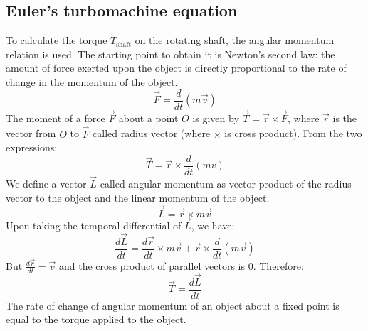 \documentclass[class=report, crop=false, 12pt,a4paper]{standalone}
\begin{document}
\subsection{Euler's turbomachine equation}
To calculate the torque $T_{\textrm{shaft}}$ on the rotating shaft, the angular momentum relation is used. The starting point to obtain it is Newton's second law: the amount of force exerted upon the object is directly proportional to the rate of change in the momentum of the object.
\begin{equation}
  \vec{F} = \frac{d}{dt}(m\vec{v})
\end{equation}
The moment of a force $\vec{F}$ about a point $O$ is given by $\vec{T} = \vec{r}\times\vec{F}$, where $\vec{r}$ is the vector from $O$ to $\vec{F}$ called radius vector (where $\times$ is cross product). From the two expressions:
\begin{equation}
  \vec{T} = \vec{r} \times \frac{d}{dt} (mv)
\end{equation}
We define a vector $\vec{L}$ called angular momentum as vector product of the radius vector to the object and the linear momentum of the object.
\begin{equation}
  \vec{L} = \vec{r} \times m \vec{v}
\end{equation}
Upon taking the temporal differential of $\vec{L}$, we have: 
\begin{equation}
  \frac{d\vec{L}}{dt} = \frac{d\vec{r}}{dt} \times m\vec{v} + \vec{r} \times \frac{d}{dt}(m\vec{v})
\end{equation}
But $ \frac{d\vec{r}}{dt} = \vec{v}$ and the cross product of parallel vectors is 0. Therefore:
\begin{equation}
  \vec{T} = \frac{d\vec{L}}{dt}
\end{equation}
The rate of change of angular momentum of an object about a fixed point is equal to the torque applied to the object.
\end{document}
